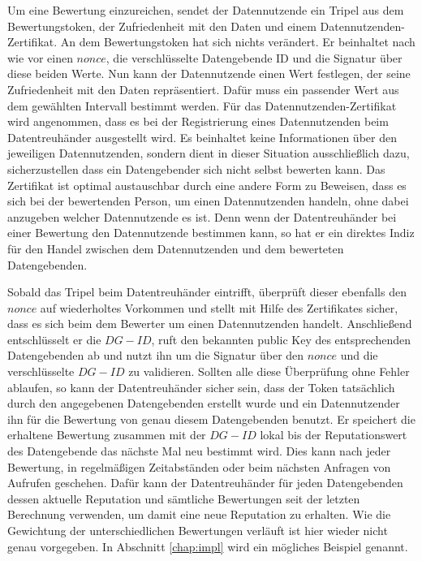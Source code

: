 \documentclass{scrreprt}
\begin{document}
Um eine Bewertung einzureichen, sendet der Datennutzende ein Tripel aus dem Bewertungstoken, der Zufriedenheit mit den Daten und einem Datennutzenden-Zertifikat. An dem Bewertungstoken hat sich nichts verändert. Er beinhaltet nach wie vor einen $nonce$, die verschlüsselte Datengebende ID und die Signatur über diese beiden Werte. Nun kann der Datennutzende einen Wert festlegen, der seine Zufriedenheit mit den Daten repräsentiert. Dafür muss ein passender Wert aus dem gewählten Intervall bestimmt werden. Für das Datennutzenden-Zertifikat wird angenommen, dass es bei der Registrierung eines Datennutzenden beim Datentreuhänder ausgestellt wird. Es beinhaltet keine Informationen über den jeweiligen Datennutzenden, sondern dient in dieser Situation ausschließlich dazu, sicherzustellen dass ein Datengebender sich nicht selbst bewerten kann. Das Zertifikat ist optimal austauschbar durch eine andere Form zu Beweisen, dass es sich bei der bewertenden Person, um einen Datennutzenden handeln, ohne dabei anzugeben welcher Datennutzende es ist. Denn wenn der Datentreuhänder bei einer Bewertung den Datennutzende bestimmen kann, so hat er ein direktes Indiz für den Handel zwischen dem Datennutzenden und dem bewerteten Datengebenden.

Sobald das Tripel beim Datentreuhänder eintrifft, überprüft dieser ebenfalls den $nonce$ auf wiederholtes Vorkommen und stellt mit Hilfe des Zertifikates sicher, dass es sich beim dem Bewerter um einen Datennutzenden handelt. Anschließend entschlüsselt er die $DG-ID$, ruft den bekannten public Key des entsprechenden Datengebenden ab und nutzt ihn um die Signatur über den $nonce$ und die verschlüsselte $DG-ID$ zu validieren. Sollten alle diese Überprüfung ohne Fehler ablaufen, so kann der Datentreuhänder sicher sein, dass der Token tatsächlich durch den angegebenen Datengebenden erstellt wurde und ein Datennutzender ihn für die Bewertung von genau diesem Datengebenden benutzt. Er speichert die erhaltene Bewertung zusammen mit der $DG-ID$ lokal bis der Reputationswert des Datengebende das nächste Mal neu bestimmt wird. Dies kann nach jeder Bewertung, in regelmäßigen Zeitabständen oder beim nächsten Anfragen von Aufrufen geschehen. Dafür kann der Datentreuhänder für jeden Datengebenden dessen aktuelle Reputation und sämtliche Bewertungen seit der letzten Berechnung verwenden, um damit eine neue Reputation zu erhalten. Wie die Gewichtung der unterschiedlichen Bewertungen verläuft ist hier wieder nicht genau vorgegeben. In Abschnitt \ref{chap:impl} wird ein mögliches Beispiel genannt.
\end{document}
